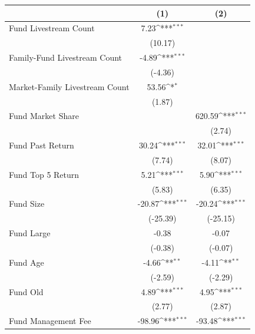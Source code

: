 {
\def\sym#1{\ifmmode^{#1}\else\(^{#1}\)\fi}
\begin{tabular}{l*{2}{c}}
\toprule
                    &\multicolumn{1}{c}{(1)}         &\multicolumn{1}{c}{(2)}         \\
\midrule
Fund Livestream Count&        7.23\sym{***}&                     \\
                    &     (10.17)         &                     \\
\addlinespace
Family-Fund Livestream Count&       -4.89\sym{***}&                     \\
                    &     (-4.36)         &                     \\
\addlinespace
Market-Family Livestream Count&       53.56\sym{*}  &                     \\
                    &      (1.87)         &                     \\
\addlinespace
Fund Market Share   &                     &      620.59\sym{***}\\
                    &                     &      (2.74)         \\
\addlinespace
Fund Past Return    &       30.24\sym{***}&       32.01\sym{***}\\
                    &      (7.74)         &      (8.07)         \\
\addlinespace
Fund Top 5 Return   &        5.21\sym{***}&        5.90\sym{***}\\
                    &      (5.83)         &      (6.35)         \\
\addlinespace
Fund Size           &      -20.87\sym{***}&      -20.24\sym{***}\\
                    &    (-25.39)         &    (-25.15)         \\
\addlinespace
Fund Large          &       -0.38         &       -0.07         \\
                    &     (-0.38)         &     (-0.07)         \\
\addlinespace
Fund Age            &       -4.66\sym{**} &       -4.11\sym{**} \\
                    &     (-2.59)         &     (-2.29)         \\
\addlinespace
Fund Old            &        4.89\sym{***}&        4.95\sym{***}\\
                    &      (2.77)         &      (2.87)         \\
\addlinespace
Fund Management Fee &      -98.96\sym{***}&      -93.48\sym{***}\\

\end{tabular}}
